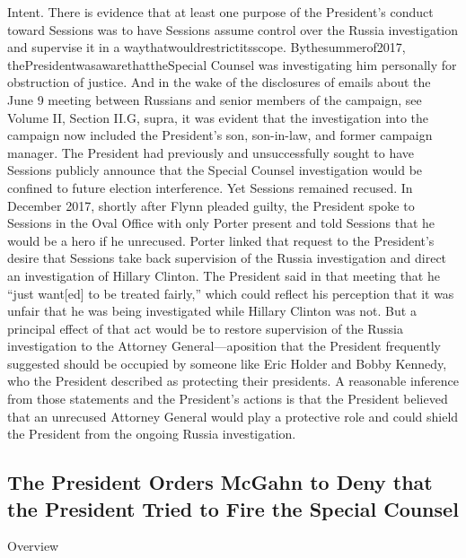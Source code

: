 Intent.
There is evidence that at least one purpose of the President's conduct toward Sessions was to have Sessions assume control over the Russia investigation and supervise it in a waythatwouldrestrictitsscope.
Bythesummerof2017, thePresidentwasawarethattheSpecial Counsel was investigating him personally for obstruction of justice.
And in the wake of the disclosures of emails about the June 9 meeting between Russians and senior members of the campaign, see Volume II, Section II.G, supra, it was evident that the investigation into the campaign now included the President's son, son-in-law, and former campaign manager.
The President had previously and unsuccessfully sought to have Sessions publicly announce that the Special Counsel investigation would be confined to future election interference.
Yet Sessions remained recused.
In December 2017, shortly after Flynn pleaded guilty, the President spoke to Sessions in the Oval Office with only Porter present and told Sessions that he would be a hero if he unrecused.
Porter linked that request to the President's desire that Sessions take back supervision of the Russia investigation and direct an investigation of Hillary Clinton.
The President said in that meeting that he “just want[ed] to be treated fairly,” which could reflect his perception that it was unfair that he was being investigated while Hillary Clinton was not.
But a principal effect of that act would be to restore supervision of the Russia investigation to the
Attorney General—aposition that the President frequently suggested should be occupied by someone like Eric Holder and Bobby Kennedy, who the President described as protecting their presidents.
A reasonable inference from those statements and the President's actions is that the President believed that an unrecused Attorney General would play a protective role and could shield the President from the ongoing Russia investigation.

\subsection{The President Orders McGahn to Deny that the President Tried to Fire the Special Counsel}

Overview

